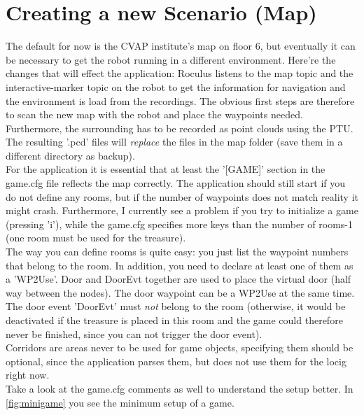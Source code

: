 \documentclass[a4paper, 12pt]{article}
\begin{document}
\section{Creating a new Scenario (Map)}
The default for now is the CVAP institute's map on floor 6, but eventually it can be necessary to get the robot running in a different environment.  Here're the changes that will effect the application: Roculus listens to the map topic and the interactive-marker topic on the robot to get the information for navigation and the environment is load from the recordings.  The obvious first steps are therefore to scan the new map with the robot and place the waypoints needed.  Furthermore, the surrounding has to be recorded as point clouds using the PTU. The resulting '.pcd' files will \emph{replace} the files in the map folder (save them in a different directory as backup).\\
For the application it is essential that at least the '[GAME]' section in the game.cfg file reflects the map correctly. The application should still start if you do not define any rooms, but if the number of waypoints does not match reality it might crash. Furthermore, I currently see a problem if you try to initialize a game (pressing 'i'), while the game.cfg specifies more keys than the number of rooms-1 (one room must be used for the treasure).\\
The way you can define rooms is quite easy: you just list the waypoint numbers that belong to the room. In addition, you need to declare at least one of them as a 'WP2Use'.  Door and DoorEvt together are used to place the virtual door (half way between the nodes).  The door waypoint can be a WP2Use at the same time.  The door event 'DoorEvt' must \emph{not} belong to the room (otherwise, it would be deactivated if the treasure is placed in this room and the game could therefore never be finished, since you can not trigger the door event).\\
Corridors are areas never to be used for game objects, specifying them should be optional, since the application parses them, but does not use them for the locig right now.\\ Take a look at the game.cfg comments as well to understand the setup better.  In \autoref{fig:minigame} you see the minimum setup of a game.
\end{document}
